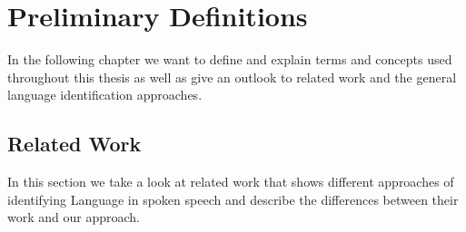 

\chapter{Preliminary Definitions}
\label{ch:Preliminary}

In the following chapter we want to define and explain terms and concepts used throughout this thesis as well as give an outlook to related work and the general language identification approaches.

\section{Related Work}

In this section we take a look at related work that shows different approaches of identifying Language in spoken speech and describe the differences between their work and our approach. 